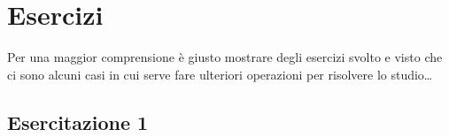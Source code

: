 \section{Esercizi}
Per una maggior comprensione è giusto mostrare degli esercizi svolto e visto che ci sono alcuni casi in cui serve fare ulteriori operazioni per risolvere lo studio\dots
\subsection{Esercitazione 1}
